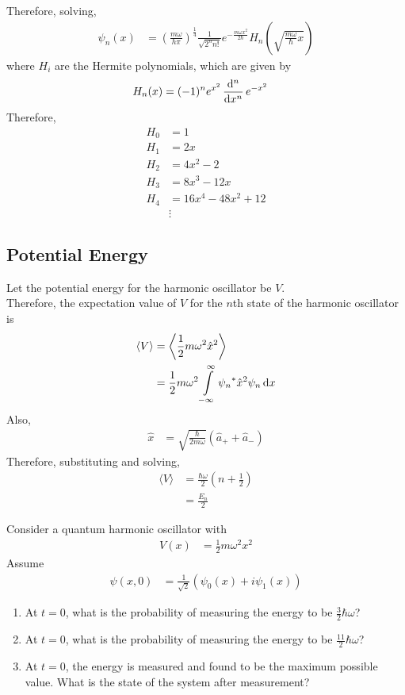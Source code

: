 \documentclass[titlepage, fleqn, a4paper, 12pt, twoside]{article}
\theoremstyle{definition}
\theoremstyle{theorem}
\begin{document}
Therefore, solving,
\begin{align*}
	\psi_n(x) &= \left( \frac{m \omega}{h \pi} \right)^{\frac{1}{4}} \frac{1}{\sqrt{2^n n!}} e^{-\frac{m \omega x^2}{2 \hbar}} H_n \left( \sqrt{\frac{m \omega}{\hbar} x} \right)
\end{align*}
where $H_i$ are the Hermite polynomials, which are given by
\begin{align*}
	H_n(x) &= (-1)^n e^{x^2} \dod[n]{}{x} e^{-x^2}
\end{align*}
Therefore,
\begin{align*}
	H_0 &= 1\\
	H_1 &= 2 x\\
	H_2 &= 4 x^2 - 2\\
	H_3 &= 8 x^3 - 12 x\\
	H_4 &= 16 x^4 - 48 x^2 + 12\\
	&\vdots
\end{align*}

\subsection{Potential Energy}

Let the potential energy for the harmonic oscillator be $V$.\\
Therefore, the expectation value of $V$ for the $n$th state of the harmonic oscillator is
\begin{align*}
	\langle V \rangle &= \left\langle \frac{1}{2} m \omega^2 \hat{x}^2 \right\rangle\\
	&= \frac{1}{2} m \omega^2 \int\limits_{-\infty}^{\infty} {\psi_n}^* \hat{x}^2 \psi_n \dif x
\end{align*}
Also,
\begin{align*}
	\hat{x} &= \sqrt{\frac{\hbar}{2 m \omega}} \left( \hat{a}_+ + \hat{a}_- \right)
\end{align*}
Therefore, substituting and solving,
\begin{align*}
	\langle V \rangle &= \frac{\hbar \omega}{2} \left( n + \frac{1}{2} \right)\\
	&= \frac{E_n}{2}
\end{align*}

\begin{question}
	Consider a quantum harmonic oscillator with
	\begin{align*}
		V(x) &= \frac{1}{2} m \omega^2 x^2
	\end{align*}
	Assume
	\begin{align*}
		\psi(x,0) &= \frac{1}{\sqrt{2}} \left( \psi_0(x) + i \psi_1(x) \right)
	\end{align*}
	\begin{enumerate}
		\item
			At $t = 0$, what is the probability of measuring the energy to be $\frac{3}{2} \hbar \omega$?
		\item
			At $t = 0$, what is the probability of measuring the energy to be $\frac{11}{2} \hbar \omega$?
		\item
			At $t = 0$, the energy is measured and found to be the maximum possible value.
			What is the state of the system after measurement?
	\end{enumerate}
\end{question}
\end{document}
